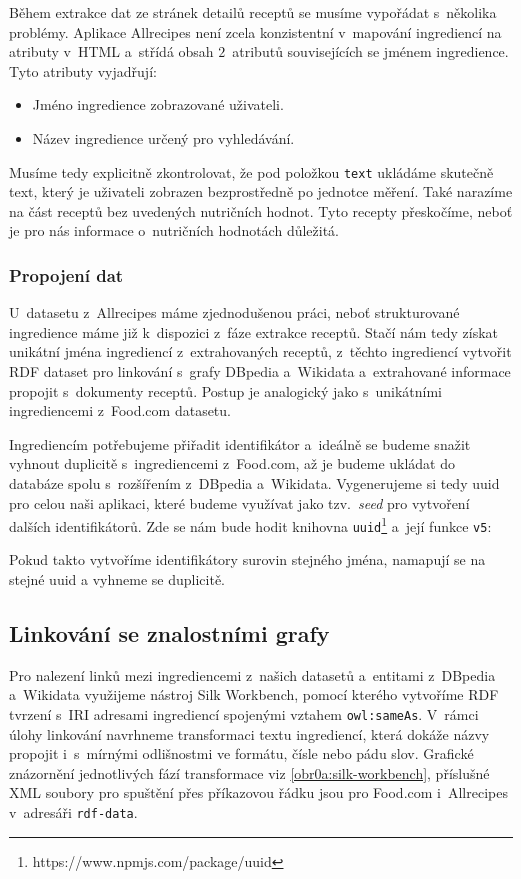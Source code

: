 Během extrakce dat ze stránek detailů receptů se musíme vypořádat s~několika problémy. Aplikace Allrecipes není zcela konzistentní v~mapování ingrediencí na atributy v~HTML a~střídá obsah $2$~atributů souvisejících se jménem ingredience. Tyto atributy vyjadřují:
\begin{itemize}
    \item Jméno ingredience zobrazované uživateli.
    \item Název ingredience určený pro vyhledávání.
\end{itemize}
Musíme tedy explicitně zkontrolovat, že pod položkou \texttt{text} ukládáme skutečně text, který je uživateli zobrazen bezprostředně po jednotce měření. Také narazíme na část receptů bez uvedených nutričních hodnot. Tyto recepty přeskočíme, neboť je pro nás informace o~nutričních hodnotách důležitá.

\subsubsection{Propojení dat}

U~datasetu z~Allrecipes máme zjednodušenou práci, neboť strukturované ingredience máme již k~dispozici z~fáze extrakce receptů. Stačí nám tedy získat unikátní jména ingrediencí z~extrahovaných receptů, z~těchto ingrediencí vytvořit RDF dataset pro linkování s~grafy DBpedia a~Wikidata a~extrahované informace propojit s~dokumenty receptů. Postup je analogický jako s~unikátními ingrediencemi z~Food.com datasetu. 

Ingrediencím potřebujeme přiřadit identifikátor a~ideálně se budeme snažit vyhnout duplicitě s~ingrediencemi z~Food.com, až je budeme ukládat do databáze spolu s~rozšířením z~DBpedia a~Wikidata. Vygenerujeme si tedy uuid pro celou naši aplikaci, které budeme využívat jako tzv.~\emph{seed} pro vytvoření dalších identifikátorů. Zde se nám bude hodit knihovna \texttt{uuid}\footnote{https://www.npmjs.com/package/uuid} a~její funkce \texttt{v5}:
\begin{code}
uuid.v5(name.toLowerCase(), NAMESPACE_UUID)}
\end{code}
Pokud takto vytvoříme identifikátory surovin stejného jména, namapují se na stejné uuid a vyhneme se duplicitě.

\subsection{Linkování se znalostními grafy}

Pro nalezení linků mezi ingrediencemi z~našich datasetů a~entitami z~DBpedia a~Wikidata využijeme nástroj Silk Workbench, pomocí kterého vytvoříme RDF tvrzení s~IRI adresami ingrediencí spojenými vztahem \texttt{owl:sameAs}. V~rámci úlohy linkování navrhneme transformaci textu ingrediencí, která dokáže názvy propojit i~s~mírnými odlišnostmi ve formátu, čísle nebo pádu slov. Grafické znázornění jednotlivých fází transformace viz \ref{obr0a:silk-workbench}, příslušné XML soubory pro spuštění přes příkazovou řádku jsou pro Food.com i~Allrecipes v~adresáři \texttt{rdf-data}.

